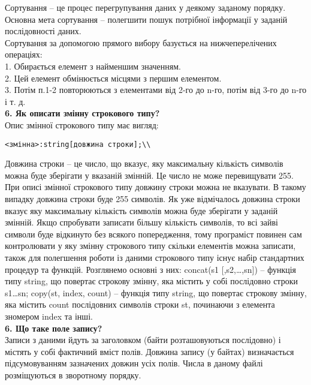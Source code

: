 \documentclass[14pt,a4paper]{scrartcl}
\begin{document}
Сортування – це процес перегрупування даних у деякому заданому
порядку. Основна мета сортування – полегшити пошук потрібної інформації у
заданій послідовності даних.\\

Сортування за допомогою прямого вибору базується на нижчеперелічених
операціях:\\

1. Обирається елемент з найменшим значенням.\\

2. Цей елемент обмінюється місцями з першим елементом.\\

3. Потім п.1-2 повторюються з елементами від 2-го до n-го, потім від 3-го до n-го і т. д.\\

\textbf{6. Як описати змінну строкового типу?}\\

Опис змінної строкового типу має вигляд:
\begin{verbatim}
<змінна>:string[довжина строки];\\
\end{verbatim}

Довжина строки – це число, що вказує, яку максимальну кількість
символів можна буде зберігати у вказаній змінній. Це число не може
перевищувати 255. При описі змінної строкового типу довжину строки можна
не вказувати. В такому випадку довжина строки буде 255 символів. Як уже
відмічалось довжина строки вказує яку максимальну кількість символів можна
буде зберігати у заданій змінній. Якщо спробувати записати більшу кількість
символів, то всі зайві символи буде відкинуто без всякого попередження, тому
програміст повинен сам контролювати у яку змінну строкового типу скільки
елементів можна записати, також для полегшення роботи із даними строкового типу існує набір стандартних
процедур та функцій. Розглянемо основні з них:
concat(s1 [,s2,…,sn]) – функція типу string, що повертає строкову змінну,
яка містить у собі послідовно строки s1…sn; copy(st, index, count) – функція типу string, що повертає строкову змінну,
яка містить count послідовних символів строки st, починаючи з елемента зномером index та інші. \\


\textbf{6. Що таке поле запису?}\\

Записи з даними йдуть за заголовком (байти розташовуються послідовно) і містять у собі фактичний вміст полів. Довжина запису (у байтах) визначається підсумовуванням зазначених довжин усіх полів. Числа в даному файлі розміщуються в зворотному порядку.\\
\end{document}
